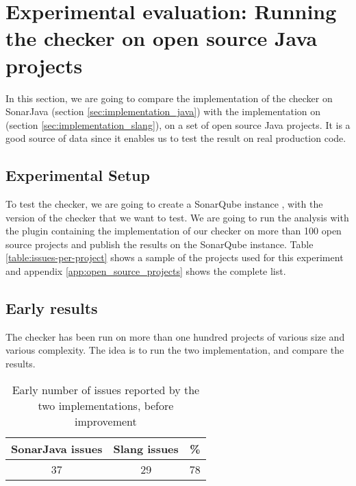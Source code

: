 \section{Experimental evaluation: \newline Running the checker on open source Java projects}
\label{sec:running_checker}

In this section, we are going to compare the implementation of the checker on SonarJava (section \ref{sec:implementation_java}) with the implementation on \slang{} (section \ref{sec:implementation_slang}), on a set of open source Java projects. 
It is a good source of data since it enables us to test the result on real production code.

\subsection{Experimental Setup}
\label{subsec:experimental_setup}

To test the checker, we are going to create a SonarQube instance \cite{SonarQube:2019:Online}, with the version of the checker that we want to test. We are going to run the analysis with the plugin containing the implementation of our checker on more than 100 open source projects and publish the results on the SonarQube instance. Table \ref{table:issues-per-project} shows a sample of the projects used for this experiment and appendix \ref{app:open_source_projects} shows the complete list.

\subsection{Early results}
\label{subsec:early_results}

The checker has been run on more than one hundred projects of various size and various complexity. 
The idea is to run the two implementation, and compare the results.

\begin{table}[h]
	\centering
	\caption{Early number of issues reported by the two implementations, before improvement}
	\label{table:early-sonarjava-vs-slang}
	\begin{tabular}{|c|c|c|}
		\hline
		\bf SonarJava issues & \bf Slang issues & \bf \% \\ \hline
		37 &  29 &  78 \\ \hline
	\end{tabular}
\end{table}


